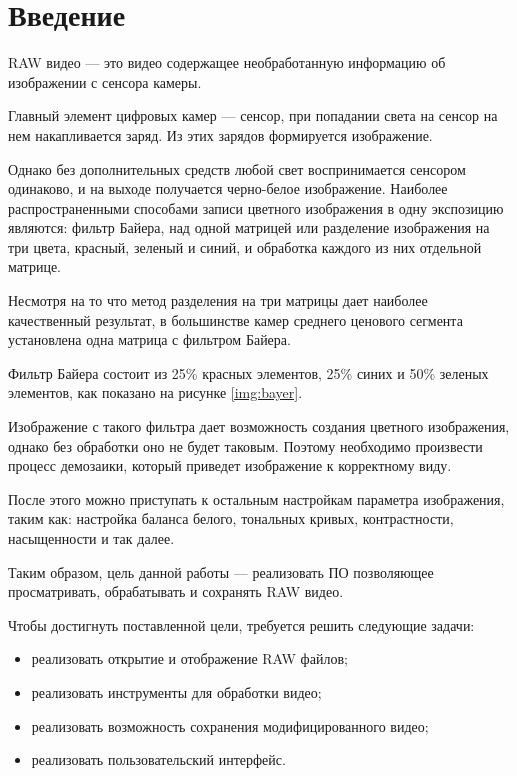 \chapter*{Введение}

RAW видео --- это видео содержащее необработанную информацию об изображении с сенсора камеры.

Главный элемент цифровых камер --- сенсор, при попадании света на сенсор на нем накапливается заряд. Из этих зарядов формируется изображение.

Однако без дополнительных средств любой свет воспринимается сенсором одинаково, и на выходе получается черно-белое изображение. Наиболее распространенными способами записи цветного изображения в одну экспозицию являются: фильтр Байера, над одной матрицей или разделение изображения на три цвета, красный, зеленый и синий, и обработка каждого из них отдельной матрице. \cite{color}

Несмотря на то что метод разделения на три матрицы дает наиболее качественный результат, в большинстве камер среднего ценового сегмента установлена одна матрица с фильтром Байера.

Фильтр Байера состоит из 25\% красных элементов, 25\% синих и 50\% зеленых элементов, как показано на рисунке \ref{img:bayer}.


Изображение с такого фильтра дает возможность создания цветного изображения, однако без обработки оно не будет таковым. Поэтому необходимо произвести процесс демозаики, который приведет изображение к корректному виду. 

После этого можно приступать к остальным настройкам параметра изображения, таким как: настройка баланса белого, тональных кривых, контрастности, насыщенности и так далее.

Таким образом, цель данной работы --- реализовать ПО позволяющее просматривать, обрабатывать и сохранять RAW видео.

Чтобы достигнуть поставленной цели, требуется решить следующие задачи:
\begin{itemize}
	\item реализовать открытие и отображение RAW файлов;
	\item реализовать инструменты для обработки видео;
	\item реализовать возможность сохранения модифицированного видео;
	\item реализовать пользовательский интерфейс.
\end{itemize}
